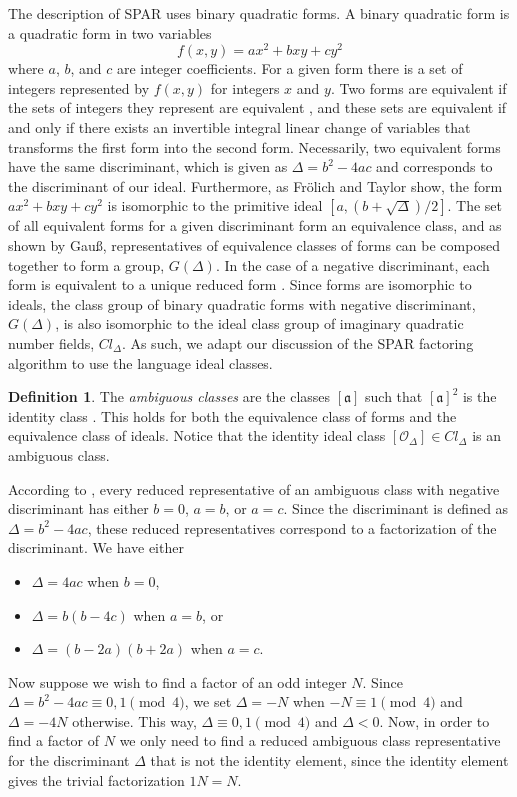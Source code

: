 \documentclass{ucalgthes1}
\theoremstyle{plain}
\theoremstyle{definition}
\newtheorem{defn}[thm]{Definition}
\begin{document}
The description of SPAR uses binary quadratic forms. A binary quadratic form is a quadratic form in two variables
\[
	f(x, y) = ax^2 + bxy + cy^2
\]
where $a$, $b$, and $c$ are integer coefficients.  For a given form there is a set of integers represented by $f(x, y)$ for integers $x$ and $y$. Two forms are equivalent if the sets of integers they represent are equivalent \cite[pp.239-240]{Crandall2005}, and these sets are equivalent if and only if there exists an invertible integral linear change of variables that transforms the first form into the second form. Necessarily, two equivalent forms have the same discriminant, which is given as $\Delta = b^2 - 4ac$ and corresponds to the discriminant of our ideal.  Furthermore, as Fr\"{o}lich and Taylor \cite{Frolich1993} show, the form $ax^2 + bxy + cy^2$ is isomorphic to the primitive ideal $[a, (b + \sqrt\Delta)/2]$.  The set of all equivalent forms for a given discriminant form an equivalence class, and as shown by Gau\ss \cite{Gauss1801}, representatives of equivalence classes of forms can be composed together to form a group, $G(\Delta)$.  In the case of a negative discriminant, each form is equivalent to a unique reduced form \cite{Guass1801}.  Since forms are isomorphic to ideals, the class group of binary quadratic forms with negative discriminant, $G(\Delta)$, is also isomorphic to the ideal class group of imaginary quadratic number fields, $Cl_\Delta$. As such, we adapt our discussion of the SPAR factoring algorithm to use the language ideal classes.

\begin{defn}
The \emph{ambiguous classes} are the classes $[\mathfrak a]$ such that ${[\mathfrak a]}^2$ is the identity class \cite{Schnorr1984}.  This holds for both the equivalence class of forms and the equivalence class of ideals.  Notice that the identity ideal class $[\mathcal O_\Delta] \in Cl_\Delta$ is an ambiguous class.
\end{defn}

According to \cite{Schnorr1984}, every reduced representative of an ambiguous class with negative discriminant has either $b = 0$, $a = b$, or $a = c$.  Since the discriminant is defined as $\Delta = b^2 - 4ac$, these reduced representatives correspond to a factorization of the discriminant.  We have either
\begin{itemize}
\item $\Delta = 4ac$ when $b = 0$,
\item $\Delta = b(b - 4c)$ when $a = b$, or
\item $\Delta = (b - 2a)(b + 2a)$ when $a = c$.
\end{itemize}
Now suppose we wish to find a factor of an odd integer $N$. Since $\Delta = b^2 - 4ac \equiv 0, 1 \pmod 4$, we set $\Delta = -N$ when $-N \equiv 1 \pmod 4$ and $\Delta = -4N$ otherwise.  This way, $\Delta \equiv 0, 1 \pmod 4$ and $\Delta < 0$. Now, in order to find a factor of $N$ we only need to find a reduced ambiguous class representative for the discriminant $\Delta$ that is not the identity element, since the identity element gives the trivial factorization $1N=N$.
\end{document}
